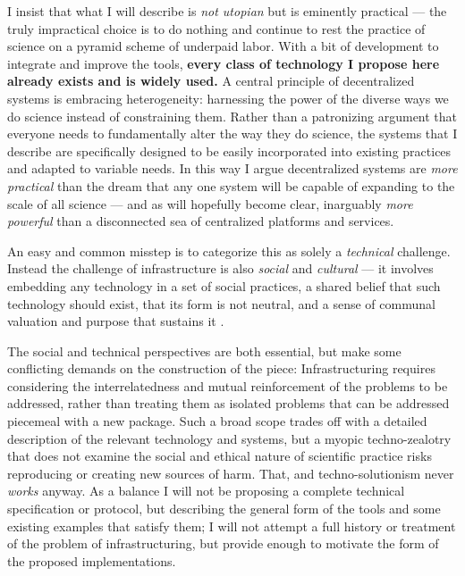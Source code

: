 \documentclass[10pt]{article}
\begin{document}
\begin{multicols}{2}
I insist that what I will describe is \emph{not utopian} but is
eminently practical --- the truly impractical choice is to do nothing
and continue to rest the practice of science on a pyramid scheme \cite{ponziSciencePyramidScheme2020}  of underpaid labor. With a bit
of development to integrate and improve the tools, \textbf{every class
of technology I propose here already exists and is widely used.} A
central principle of decentralized systems is embracing heterogeneity:
harnessing the power of the diverse ways we do science instead of
constraining them. Rather than a patronizing argument that everyone
needs to fundamentally alter the way they do science, the systems that I
describe are specifically designed to be easily incorporated into
existing practices and adapted to variable needs. In this way I argue
decentralized systems are \emph{more practical} than the dream that any
one system will be capable of expanding to the scale of all science ---
and as will hopefully become clear, inarguably \emph{more powerful} than
a disconnected sea of centralized platforms and services.

An easy and common misstep is to categorize this as solely a
\emph{technical} challenge. Instead the challenge of infrastructure is
also \emph{social} and \emph{cultural} --- it involves embedding any
technology in a set of social practices, a shared belief that such
technology should exist, that its form is not neutral, and a sense of
communal valuation and purpose that sustains it \cite{bietzSustainingDevelopmentCyberinfrastructure2012} .

The social and technical perspectives are both essential, but make some
conflicting demands on the construction of the piece: Infrastructuring
requires considering the interrelatedness and mutual reinforcement of
the problems to be addressed, rather than treating them as isolated
problems that can be addressed piecemeal with a new package. Such a
broad scope trades off with a detailed description of the relevant
technology and systems, but a myopic techno-zealotry that does not
examine the social and ethical nature of scientific practice risks
reproducing or creating new sources of harm. That, and
techno-solutionism never \emph{works} anyway. As a balance I will not be
proposing a complete technical specification or protocol, but describing
the general form of the tools and some existing examples that satisfy
them; I will not attempt a full history or treatment of the problem of
infrastructuring, but provide enough to motivate the form of the
proposed implementations.


\end{multicols}
\end{document}
